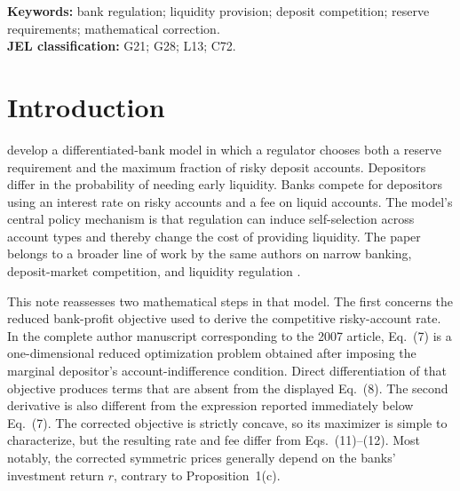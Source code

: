 \begin{abstract}
Shy and Stenbacka (2007) study regulation of banks that offer risky and liquid deposit accounts. I re-examine the reduced bank-profit problem used to derive their deposit-rate and fee formulas. Direct differentiation of the stated reduced objective yields additional terms and a different Hessian, so the displayed best response does not solve that objective. I derive the corrected reduced best response, symmetric rate and fee, and comparative statics. In particular, both prices generally depend on the banks' investment return. I also identify a separate constrained-optimization issue in the regulator's problem: when the liquidity value exceeds the investment return, optimization along the binding reserve boundary selects full risky-account coverage with sufficient reserves rather than the reported interior mix. The aggregate-welfare identity itself survives. The analysis is deliberately limited to the source's reduced problem and symmetric implementation; it does not complete unspecified off-path states of the original two-instrument game.
\end{abstract}

\noindent\textbf{Keywords:} bank regulation; liquidity provision; deposit competition; reserve requirements; mathematical correction.\\
\textbf{JEL classification:} G21; G28; L13; C72.

\section{Introduction}
\citet{ShyStenbacka2007} develop a differentiated-bank model in which a regulator chooses both a reserve requirement and the maximum fraction of risky deposit accounts. Depositors differ in the probability of needing early liquidity. Banks compete for depositors using an interest rate on risky accounts and a fee on liquid accounts. The model's central policy mechanism is that regulation can induce self-selection across account types and thereby change the cost of providing liquidity. The paper belongs to a broader line of work by the same authors on narrow banking, deposit-market competition, and liquidity regulation \citep{ShyStenbacka2000,ShyStenbacka2008,ShyStenbacka2019,ShyStenbacka2024}.

This note reassesses two mathematical steps in that model. The first concerns the reduced bank-profit objective used to derive the competitive risky-account rate. In the complete author manuscript corresponding to the 2007 article, Eq.~(7) is a one-dimensional reduced optimization problem obtained after imposing the marginal depositor's account-indifference condition. Direct differentiation of that objective produces terms that are absent from the displayed Eq.~(8). The second derivative is also different from the expression reported immediately below Eq.~(7). The corrected objective is strictly concave, so its maximizer is simple to characterize, but the resulting rate and fee differ from Eqs.~(11)--(12). Most notably, the corrected symmetric prices generally depend on the banks' investment return $r$, contrary to Proposition~1(c).

